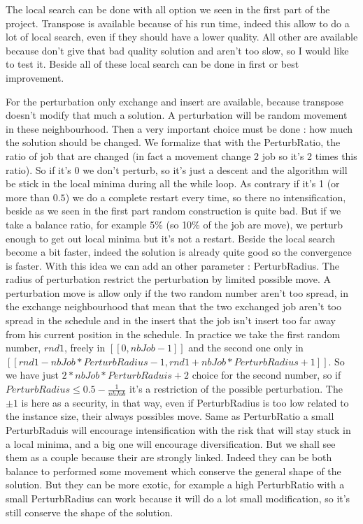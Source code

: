 \documentclass[12pt,a4paper]{article}
\begin{document}
The local search can be done with all option we seen in the first part of the project. Transpose is available because of his run time, indeed this allow to do a lot of local search, even if they should have a lower quality. All other are available because don't give that bad quality solution and aren't too slow, so I would like to test it. Beside all of these local search can be done in first or best improvement.

For the perturbation only exchange and insert are available, because transpose doesn't modify that much a solution. A perturbation will be random movement in these neighbourhood. Then a very important choice must be done : how much the solution should be changed. We formalize that with the PerturbRatio, the ratio of job that are changed (in fact a movement change 2 job so it's 2 times this ratio). So if it's 0 we don't perturb, so it's just a descent and the algorithm will be stick in the local minima during all the while loop. As contrary if it's 1 (or more than $0.5$) we do a complete restart every time, so there no intensification, beside as we seen in the first part random construction is quite bad. But if we take a balance ratio, for example 5\% (so 10\% of the job are move), we perturb enough to get out local minima but it's not a restart. Beside the local search become a bit faster, indeed the solution is already quite good so the convergence is faster. With this idea we can add an other parameter : PerturbRadius. The radius of perturbation restrict the perturbation by limited possible move. A perturbation move is allow only if the two random number aren't too spread, in the exchange neighbourhood that mean that the two exchanged job aren't too spread in the schedule and in the insert that the job isn't insert too far away from his current position in the schedule. In practice we take the first random number, $rnd1$, freely in $[\![ 0 , nbJob-1 ]\!]$ and the second one only in $[\![ rnd1 - nbJob*PerturbRadius -1 , rnd1 + nbJob*PerturbRadius +1 ]\!]$. So we have just $2*nbJob*PerturbRaduis +2$ choice for the second number, so if $PerturbRadius \leqslant 0.5 - \frac{1}{nbJob}$ it's a restriction of the possible perturbation. The $\pm 1$ is here as a security, in that way, even if PerturbRadius is too low related to the instance size, their always possibles move. Same as PerturbRatio a small PerturbRaduis will encourage intensification with the risk that will stay stuck in a local minima, and a big one will encourage diversification. But we shall see them as a couple because their are strongly linked. Indeed they can be both balance to performed some movement which conserve the general shape of the solution. But they can be more exotic, for example a high PerturbRatio with a small PerturbRadius can work because it will do a lot small modification, so it's still conserve the shape of the solution.
\end{document}
